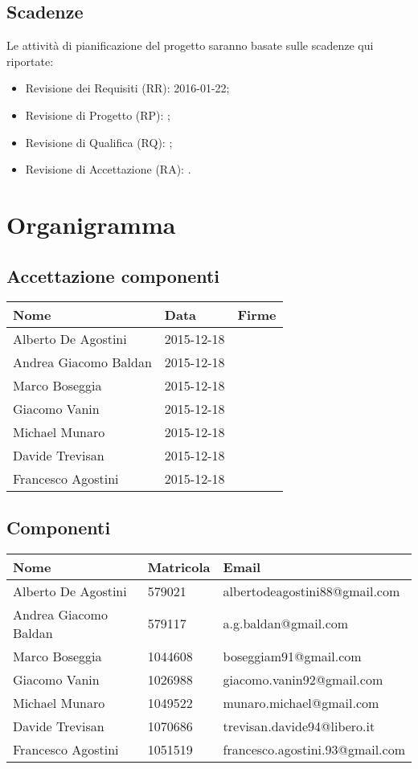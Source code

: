 \documentclass{scalatekids-article}
\begin{document}
\subsection{Scadenze}
Le attività di pianificazione del progetto saranno basate sulle scadenze qui riportate:
\begin{itemize}
\item {Revisione dei Requisiti (RR): 2016-01-22;}
\item {Revisione di Progetto (RP): ;}
\item {Revisione di Qualifica (RQ): ;}
\item {Revisione di Accettazione (RA): .}
\end{itemize}
\section{Organigramma}
\subsection{Accettazione componenti}
\begin{center}
  \begin{tabular}{|l | l | p{4cm} |}
    \hline
    Nome & Data & Firme \\
    \hline
    Alberto De Agostini & 2015-12-18 &\\
    Andrea Giacomo Baldan & 2015-12-18 &\\
    Marco Boseggia & 2015-12-18 &\\
    Giacomo Vanin & 2015-12-18 &\\
    Michael Munaro & 2015-12-18 &\\
    Davide Trevisan & 2015-12-18 &\\
    Francesco Agostini & 2015-12-18 &\\
    \hline
  \end{tabular}
\end{center}
\subsection{Componenti}
\begin{center}
  \begin{tabular}{|l | l | l |}
    \hline
    Nome & Matricola & Email \\
    \hline
    Alberto De Agostini & 579021 & albertodeagostini88@gmail.com\\
    Andrea Giacomo Baldan & 579117 & a.g.baldan@gmail.com\\
    Marco Boseggia & 1044608 & boseggiam91@gmail.com\\
    Giacomo Vanin & 1026988 & giacomo.vanin92@gmail.com\\
    Michael Munaro & 1049522 & munaro.michael@gmail.com\\
    Davide Trevisan & 1070686 & trevisan.davide94@libero.it\\
    Francesco Agostini & 1051519 & francesco.agostini.93@gmail.com\\
    \hline
  \end{tabular}
\end{center}
\end{document}
